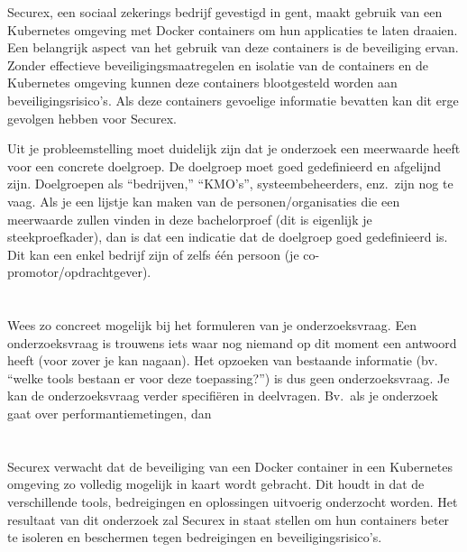 Securex, een sociaal zekerings bedrijf gevestigd in gent, maakt gebruik van een Kubernetes omgeving met Docker containers om hun applicaties te laten draaien. Een belangrijk aspect van het gebruik van deze containers is de beveiliging ervan. Zonder effectieve beveiligingsmaatregelen en isolatie van de containers en de Kubernetes omgeving kunnen deze containers blootgesteld worden aan beveiligingsrisico's. Als deze containers gevoelige informatie bevatten kan dit erge gevolgen hebben voor Securex.


Uit je probleemstelling moet duidelijk zijn dat je onderzoek een meerwaarde heeft voor een concrete doelgroep. De doelgroep moet goed gedefinieerd en afgelijnd zijn. Doelgroepen als ``bedrijven,'' ``KMO's'', systeembeheerders, enz.~zijn nog te vaag. Als je een lijstje kan maken van de personen/organisaties die een meerwaarde zullen vinden in deze bachelorproef (dit is eigenlijk je steekproefkader), dan is dat een indicatie dat de doelgroep goed gedefinieerd is. Dit kan een enkel bedrijf zijn of zelfs één persoon (je co-promotor/opdrachtgever).

\section{}%
\label{sec:onderzoeksvraag}

Wees zo concreet mogelijk bij het formuleren van je onderzoeksvraag. Een onderzoeksvraag is trouwens iets waar nog niemand op dit moment een antwoord heeft (voor zover je kan nagaan). Het opzoeken van bestaande informatie (bv. ``welke tools bestaan er voor deze toepassing?'') is dus geen onderzoeksvraag. Je kan de onderzoeksvraag verder specifiëren in deelvragen. Bv.~als je onderzoek gaat over performantiemetingen, dan 

\section{}%
\label{sec:onderzoeksdoelstelling}

Securex verwacht dat de beveiliging van een Docker container in een Kubernetes omgeving zo volledig mogelijk in kaart wordt gebracht. Dit houdt in dat de verschillende tools, bedreigingen en oplossingen uitvoerig onderzocht worden. Het resultaat van dit onderzoek zal Securex in staat stellen om hun containers beter te isoleren en beschermen tegen bedreigingen en beveiligingsrisico's.



